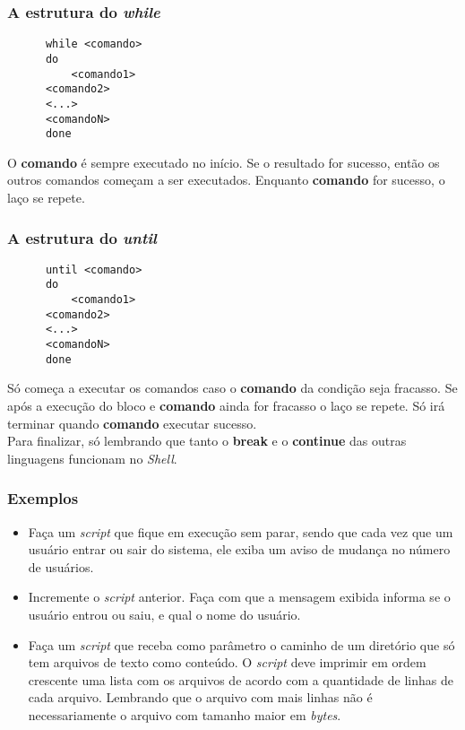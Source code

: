 \documentclass{beamer}
\begin{document}
   \begin{frame}[fragile]
      \frametitle{A estrutura do \textit{while}}
      \begin{verbatim}
      while <comando>
      do
          <comando1>
	  <comando2>
	  <...>
	  <comandoN>
      done
      \end{verbatim}
      O \textbf{comando} é sempre executado no início. Se o resultado for sucesso, então os outros comandos começam a ser executados. Enquanto \textbf{comando} for sucesso, o laço se repete.
\end{frame}

   \begin{frame}[fragile]
      \frametitle{A estrutura do \textit{until}}
      \begin{verbatim}
      until <comando>
      do
          <comando1>
	  <comando2>
	  <...>
	  <comandoN>
      done
      \end{verbatim}
      Só começa a executar os comandos caso o \textbf{comando} da condição seja fracasso. Se após a execução do bloco e \textbf{comando} ainda for fracasso o laço se repete. Só irá terminar quando \textbf{comando} executar sucesso. \\ 
      Para finalizar, só lembrando que tanto o \textbf{break} e o \textbf{continue} das outras linguagens funcionam no \textit{Shell}.
\end{frame}

   \begin{frame}
      \frametitle{Exemplos}
      \begin{itemize}
         \item Faça um \textit{script} que fique em execução sem parar, sendo que cada vez que um usuário entrar ou sair do sistema, ele exiba um aviso de mudança no número de usuários.
	      \item Incremente o \textit{script} anterior. Faça com que a mensagem exibida informa se o usuário entrou ou saiu, e qual o nome do usuário.
	      \item Faça um \textit{script} que receba como parâmetro o caminho de um diretório que só tem arquivos de texto como conteúdo. O \textit{script} deve imprimir em ordem crescente uma lista com os arquivos de acordo com a quantidade de linhas de cada arquivo. Lembrando que o arquivo com mais linhas não é necessariamente o arquivo com tamanho maior em \textit{bytes}.
      \end{itemize}
   \end{frame}
\end{document}
